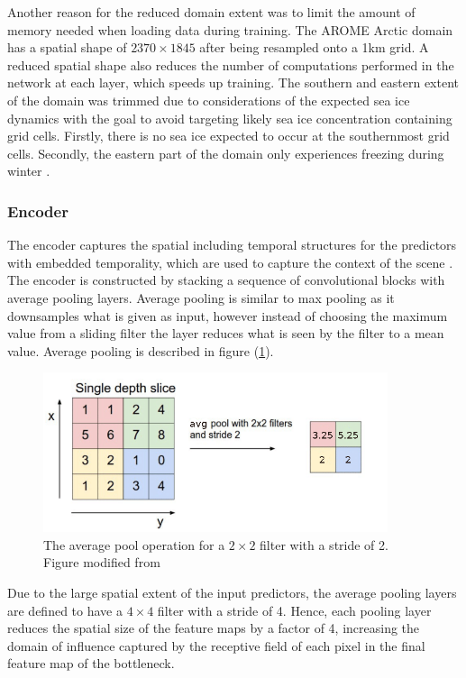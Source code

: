 \documentclass[../main/thesis]{subfiles}
\begin{document}
Another reason for the reduced domain extent was to limit the amount of memory needed when loading data during training. The AROME Arctic domain has a spatial shape of $2370 \times 1845$ after being resampled onto a 1km grid. A reduced spatial shape also reduces the number of computations performed in the network at each layer, which speeds up training. The southern and eastern extent of the domain was trimmed due to considerations of the expected sea ice dynamics with the goal to avoid targeting likely sea ice concentration containing grid cells. Firstly, there is no sea ice expected to occur at the southernmost grid cells. Secondly, the eastern part of the domain only experiences freezing during winter \citep{Serreze2019}.

\subsubsection{Encoder}
The encoder captures the spatial including temporal structures for the predictors with embedded temporality, which are used to capture the context of the scene \citep{Ronneberger2015}. The encoder is constructed by stacking a sequence of convolutional blocks with average pooling layers. Average pooling is similar to max pooling as it downsamples what is given as input, however instead of choosing the maximum value from a sliding filter the layer reduces what is seen by the filter to a mean value. Average pooling is described in figure (\ref{fig:avgpool}).

\begin{figure}
    \centering
    \includegraphics[width=0.9\textwidth]{The-AvgPool-operation.png}
    \caption{\label{fig:avgpool}The average pool operation for a $2 \times 2$ filter with a stride of 2. Figure modified from \protect\citep{MihaiDaniel2020}}
\end{figure}

Due to the large spatial extent of the input predictors, the average pooling layers are defined to have a $4 \times 4$ filter with a stride of 4. Hence, each pooling layer reduces the spatial size of the feature maps by a factor of 4, increasing the domain of influence captured by the receptive field of each pixel in the final feature map of the bottleneck.
\end{document}
